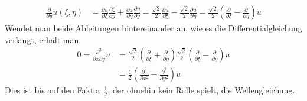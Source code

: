 \begin{loesung}
\begin{teilaufgaben}
\begin{align*}
\\
\frac{\partial}{\partial y}u(\xi,\eta)
&=
\frac{\partial u}{\partial \xi}\frac{\partial \xi}{\partial y}
+
\frac{\partial u}{\partial \eta}\frac{\partial \eta}{\partial y}
=
\frac{\sqrt{2}}2\frac{\partial u}{\partial\xi}
-\frac{\sqrt{2}}2\frac{\partial u}{\partial\eta}
=
\frac{\sqrt{2}}2\left(\frac{\partial}{\partial \xi}-\frac{\partial}{\partial\eta}\right)u
\end{align*}
Wendet man beide Ableitungen hintereinander an, wie es die
Differentialgleichung verlangt, erhält man
\begin{align*}
0=\frac{\partial^2}{\partial x\partial y}u
&=
\frac{\sqrt{2}}2
\left(\frac{\partial}{\partial \xi}+\frac{\partial}{\partial\eta}\right)
\frac{\sqrt{2}}2
\left(\frac{\partial}{\partial \xi}-\frac{\partial}{\partial\eta}\right)u
\\
&=
\frac12
\left(
\frac{\partial^2}{\partial x^2}-\frac{\partial^2}{\partial y^2}
\right)u
\end{align*}
Dies ist bis auf den Faktor $\frac12$, der ohnehin kein Rolle spielt,
die Wellengleichung.
\qedhere
\end{teilaufgaben}
\end{loesung}
